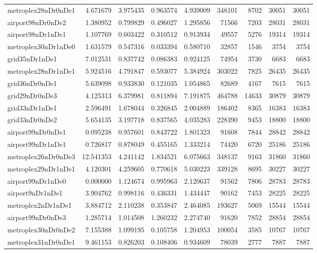 \begin{longtable}{|l|r|r|r|r|r|r|r|r|}
metroplex28nDr0nDe1 & 4.671679 & 3.975435 & 0.963574 & 4.939009 & 348101 & 8702 & 30051 & 30051 \\
airport98nDr0nDe2 & 1.380952 & 0.799829 & 0.496027 & 1.295856 & 71566 & 7203 & 28031 & 28031 \\
airport98nDr1nDe1 & 1.107769 & 0.603422 & 0.310512 & 0.913934 & 49557 & 5276 & 19314 & 19314 \\
metroplex30nDr1nDe0 & 1.631579 & 0.547316 & 0.033394 & 0.580710 & 32857 & 1546 & 3754 & 3754 \\
grid35nDr1nDe1 & 7.012531 & 0.837742 & 0.086383 & 0.924125 & 74954 & 3730 & 6683 & 6683 \\
metroplex28nDr1nDe1 & 5.924516 & 4.791847 & 0.593077 & 5.384924 & 303022 & 7825 & 26435 & 26435 \\
grid36nDr0nDe1 & 5.639098 & 0.933830 & 0.121035 & 1.054865 & 82689 & 4167 & 7615 & 7615 \\
grid29nDr0nDe3 & 4.125313 & 6.379981 & 0.811894 & 7.191875 & 464788 & 14633 & 30879 & 30879 \\
grid33nDr1nDe1 & 2.596491 & 1.678044 & 0.326845 & 2.004889 & 186402 & 8365 & 16383 & 16383 \\
grid33nDr0nDe2 & 5.654135 & 3.197718 & 0.837565 & 4.035283 & 228390 & 9453 & 18800 & 18800 \\
airport99nDr0nDe1 & 0.095238 & 0.957601 & 0.843722 & 1.801323 & 91608 & 7844 & 28842 & 28842 \\
airport99nDr1nDe1 & 0.726817 & 0.878049 & 0.455165 & 1.333214 & 74420 & 6720 & 25186 & 25186 \\
metroplex26nDr0nDe3 & 12.541353 & 4.241142 & 1.834521 & 6.075663 & 348137 & 9163 & 31860 & 31860 \\
metroplex29nDr1nDe1 & 4.120301 & 4.259605 & 0.770618 & 5.030223 & 339128 & 8695 & 30227 & 30227 \\
airport99nDr1nDe0 & 0.000000 & 1.124674 & 0.995963 & 2.120637 & 91562 & 7806 & 28783 & 28783 \\
airport9nDr1nDe1 & 3.904762 & 0.998116 & 0.436331 & 1.434447 & 90162 & 7453 & 28225 & 28225 \\
metroplex2nDr1nDe1 & 3.884712 & 2.110238 & 0.353847 & 2.464085 & 193627 & 5069 & 15544 & 15544 \\
airport99nDr0nDe3 & 1.285714 & 1.014508 & 1.260232 & 2.274740 & 91620 & 7852 & 28854 & 28854 \\
metroplex30nDr0nDe2 & 7.155388 & 1.099195 & 0.105758 & 1.204953 & 100054 & 3585 & 10767 & 10767 \\
metroplex31nDr0nDe1 & 9.461153 & 0.826203 & 0.108406 & 0.934609 & 78039 & 2777 & 7887 & 7887 \\

\end{longtable}
